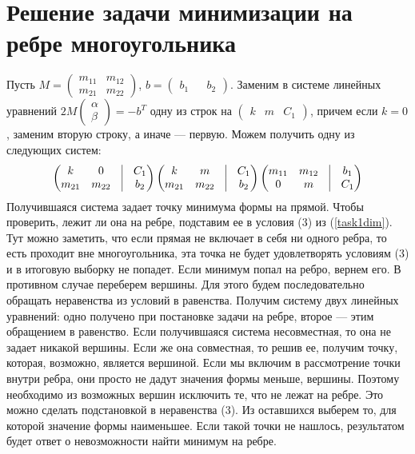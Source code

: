 \documentclass[pdftex,ptm,12pt,a4paper]{report}
\begin{document}
\section{Решение задачи минимизации на ребре многоугольника}
  Пусть $M = \begin{pmatrix} m_{11} & m_{12} \\ m_{21} & m_{22} \end{pmatrix}$,
        $b = \begin{pmatrix} b_1 && b_2 \end{pmatrix}$.
  Заменим в системе линейных уравнений $2M \begin{pmatrix} \alpha \\ \beta \end{pmatrix} = - b^T$ одну из строк на $\begin{pmatrix} k & m & C_1 \end{pmatrix}$,
  причем если $k=0$, заменим вторую строку, а иначе --- первую.
  Можем получить одну из следующих систем:
  \[
    \begin{pmatrix}
      k & 0 & \vrule & C_1 \\
      m_{21} & m_{22} & \vrule & b_2
    \end{pmatrix}
    \begin{pmatrix}
      k & m & \vrule & C_1 \\
      m_{21} & m_{22} & \vrule & b_2
    \end{pmatrix}
    \begin{pmatrix}
      m_{11} & m_{12} & \vrule & b_1 \\
      0 & m & \vrule & C_1
    \end{pmatrix}
  \]
  Получившаяся система задает точку минимума формы на прямой.
  Чтобы проверить, лежит ли она на ребре, подставим ее в условия (3) из (\ref{task1dim}).
  Тут можно заметить, что если прямая не включает в себя ни одного ребра, то есть проходит вне многоугольника,
  эта точка не будет удовлетворять условиям (3) и в итоговую выборку не попадет.
  Если минимум попал на ребро, вернем его.
  В противном случае переберем вершины.
  Для этого будем последовательно обращать неравенства из условий в равенства.
  Получим систему двух линейных уравнений: одно получено при постановке задачи на ребре, второе --- этим обращением в равенство.
  Если получившаяся система несовместная, то она не задает никакой вершины.
  Если же она совместная, то решив ее, получим точку, которая, возможно, является вершиной.
  Если мы включим в рассмотрение точки внутри ребра, они просто не дадут значения формы меньше, вершины.
  Поэтому необходимо из возможных вершин исключить те, что не лежат на ребре.
  Это можно сделать подстановкой в неравенства (3).
  Из оставшихся выберем то, для которой значение формы наименьшее.
  Если такой точки не нашлось, результатом будет ответ о невозможности найти минимум на ребре.
\end{document}
